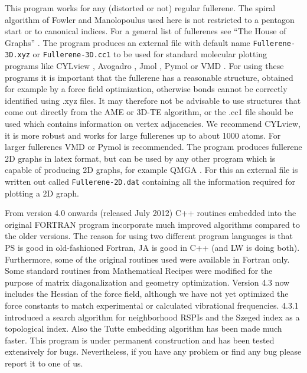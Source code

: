 \documentclass[article,a4paper,twoside]{memoir}
\newcommand{\filename}[1]{\texttt{#1}}
\begin{document}
This program works for any (distorted or not) regular fullerene. The spiral algorithm of Fowler and Manolopoulus used here \cite{Atlas}
is not restricted to a pentagon start or to canonical indices. For a general list of fullerenes see ``The House of Graphs'' \cite{HouseofGraphs}. 
The program produces an external file with default name \filename{Fullerene-3D.xyz} or \filename{Fullerene-3D.cc1} to be used for standard molecular plotting programs
like CYLview \cite{CYLview}, Avogadro \cite{Avogadro}, Jmol \cite{JMol}, Pymol \cite{Pymol} or VMD \cite{vmd}.  For using these programs 
it is important that the fullerene has a reasonable structure, obtained for example by a force field 
optimization, otherwise bonds cannot be correctly identified using .xyz files. It may therefore not be advisable to use structures that come out directly from
the AME or 3D-TE algorithm, or the .cc1 file should be used which contains information on vertex adjacencies. 
We recommend CYLview, it is more robust and works for large fullerenes up to about 1000 atoms. 
For larger fullerenes VMD or Pymol is recommended. The program produces fullerene 2D graphs in latex format, but can
be used by any other program which is capable of producing 2D graphs, for example QMGA \cite{Gabriel2008}. 
For this an external file is written out called \filename{Fullerene-2D.dat} containing all the information required for plotting a 2D graph.

From version 4.0 onwards (released July 2012) C++ routines embedded into the original FORTRAN program incorporate
much improved algorithms compared to the older versions. The reason for using two different program languages is
that PS is good in old-fashioned Fortran, JA is good in C++ (and LW is doing both).  Furthermore, some of the original routines used were available 
in Fortran only. Some standard routines from Mathematical Recipes were modified for the purpose of matrix diagonalization 
and geometry optimization. Version 4.3 now includes the Hessian of the force field, although 
we have not yet optimized the force constants to match experimental or calculated vibrational frequencies.
4.3.1 introduced a search algorithm for neighborhood RSPIs and the Szeged index as a topological index.
Also the Tutte embedding algorithm has been made much faster.
This program is under permanent construction and has been tested extensively for bugs.
Nevertheless, if you have any problem or find any bug please report it to one of us.
\end{document}
